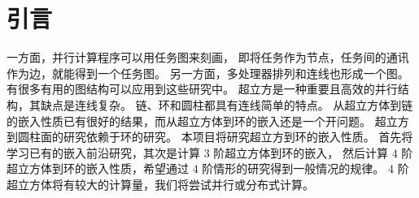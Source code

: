 
\chapter{引言}

一方面，并行计算程序可以用任务图来刻画，
即将任务作为节点，任务间的通讯作为边，就能得到一个任务图。
另一方面，多处理器排列和连线也形成一个图。
有很多有用的图结构可以应用到这些研究中。
超立方是一种重要且高效的并行结构，其缺点是连线复杂。
链、环和圆柱都具有连线简单的特点。
从超立方体到链的嵌入性质已有很好的结果，而从超立方体到环的嵌入还是一个开问题。
超立方到圆柱面的研究依赖于环的研究。
本项目将研究超立方到环的嵌入性质。
首先将学习已有的嵌入前沿研究，其次是计算 $3$ 阶超立方体到环的嵌入，
然后计算 $4$ 阶超立方体到环的嵌入性质，希望通过 $4$ 阶情形的研究得到一般情况的规律。
$4$ 阶超立方体将有较大的计算量，我们将尝试并行或分布式计算。
